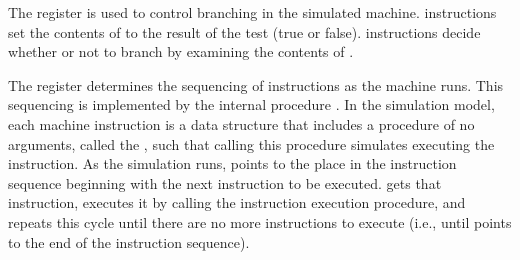 The  register is used to control branching in the simulated machine.
 instructions set the contents of  to the result of the test (true or false).
 instructions decide whether or not to branch by examining the contents of .

The  register determines the sequencing of instructions as the machine runs.
This sequencing is implemented by the internal procedure .
In the simulation model, each machine instruction is a data structure that includes a procedure of no arguments, called the , such that calling this procedure simulates executing the instruction.
As the simulation runs,  points to the place in the instruction sequence beginning with the next instruction to be executed.
 gets that instruction, executes it by calling the instruction execution procedure, and repeats this cycle until there are no more instructions to execute (i.e., until  points to the end of the instruction sequence).

